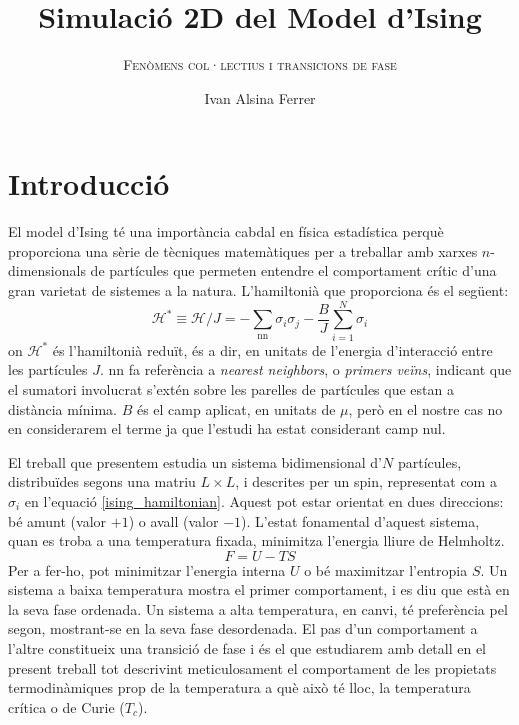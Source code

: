 \documentclass[a4paper]{article}
\title{\textbf{Simulació 2D del Model d'Ising}}
\subtitle{\scshape{Fenòmens col·lectius i transicions de fase}}
\author{Ivan Alsina Ferrer}
\date{}
\begin{document}
\maketitle

\section{Introducció}

El model d'Ising té una importància cabdal en física estadística perquè proporciona una sèrie de tècniques matemàtiques per a treballar amb xarxes $n$-dimensionals de partícules que permeten entendre el comportament crític d'una gran varietat de sistemes a la natura. L'hamiltonià que proporciona és el següent:
\begin{equation} \label{ising_hamiltonian}
    \mathcal{H}^* \equiv \mathcal{H}/J = -\sum_\text{nn} \sigma_i \sigma_j - \frac{B}{J} \sum_{i=1}^{N} \sigma_i
\end{equation}
on $\mathcal{H}^*$ és l'hamiltonià reduït, és a dir, en unitats de l'energia d'interacció entre les partícules $J$. nn fa referència a \textit{nearest neighbors}, o \textit{primers veïns}, indicant que el sumatori involucrat s'extén sobre les parelles de partícules que estan a distància mínima. $B$ és el camp aplicat, en unitats de $\mu$, però en el nostre cas no en considerarem el terme ja que l'estudi ha estat considerant camp nul.

El treball que presentem estudia un sistema bidimensional d'$N$ partícules, distribuïdes segons una matriu $L\times L$, i descrites per un spin, representat com a $\sigma_i$ en l'equació \eqref{ising_hamiltonian}. Aquest pot estar orientat en dues direccions: bé amunt (valor $+1$) o avall (valor $-1$). L'estat fonamental d'aquest sistema, quan es troba a una temperatura fixada, minimitza l'energia lliure de Helmholtz.
\begin{equation*}
    F = U - TS
\end{equation*}
Per a fer-ho, pot minimitzar l'energia interna $U$ o bé maximitzar l'entropia $S$. Un sistema a baixa temperatura mostra el primer comportament, i es diu que està en la seva fase ordenada. Un sistema a alta temperatura, en canvi, té preferència pel segon, mostrant-se en la seva fase desordenada. El pas d'un comportament a l'altre constitueix una transició de fase i és el que estudiarem amb detall en el present treball tot descrivint meticulosament el comportament de les propietats termodinàmiques prop de la temperatura a què això té lloc, la temperatura crítica o de Curie ($T_c$).
\end{document}
